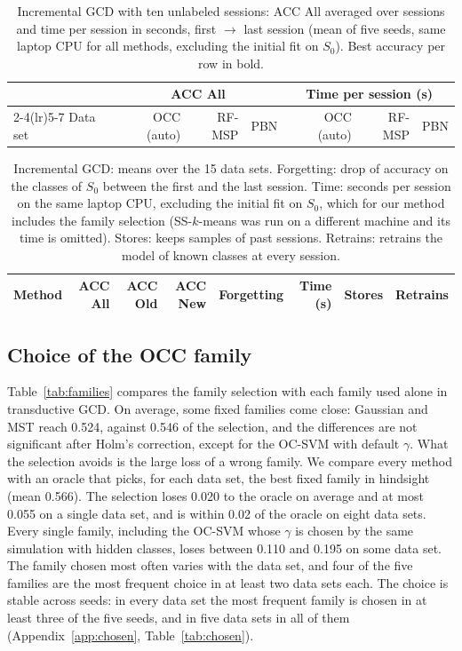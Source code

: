 \documentclass[pdflatex,sn-basic]{sn-jnl}
\begin{document}
\begin{table}[t]
\caption{Incremental GCD with ten unlabeled sessions: ACC All averaged over sessions and time per session in seconds, first $\to$ last session (mean of five seeds, same laptop CPU for all methods, excluding the initial fit on $S_0$). Best accuracy per row in bold.}\label{tab:c4long}
\centering\footnotesize
\begin{tabular}{@{}lrrrrrr@{}}
\toprule
 & \multicolumn{3}{c}{ACC All} & \multicolumn{3}{c}{Time per session (s)} \\
\cmidrule(lr){2-4}\cmidrule(lr){5-7}
Data set & OCC (auto) & RF-MSP & PBN & OCC (auto) & RF-MSP & PBN \\
\midrule

\end{tabular}
\end{table}

\begin{table}[t]
\caption{Incremental GCD: means over the 15 data sets. Forgetting: drop of accuracy on the classes of $S_0$ between the first and the last session. Time: seconds per session on the same laptop CPU, excluding the initial fit on $S_0$, which for our method includes the family selection (SS-$k$-means was run on a different machine and its time is omitted). Stores: keeps samples of past sessions. Retrains: retrains the model of known classes at every session.}\label{tab:c4summary}
\centering\footnotesize
\begin{tabular}{@{}lrrrrrll@{}}
\toprule
Method & ACC All & ACC Old & ACC New & Forgetting & Time (s) & Stores & Retrains \\
\midrule

\end{tabular}
\end{table}

\subsection{Choice of the OCC family}\label{sec:res-selection}

Table~\ref{tab:families} compares the family selection with each family used alone in transductive GCD. On average, some fixed families come close: Gaussian and MST reach 0.524, against 0.546 of the selection, and the differences are not significant after Holm's correction, except for the OC-SVM with default $\gamma$. What the selection avoids is the large loss of a wrong family. We compare every method with an oracle that picks, for each data set, the best fixed family in hindsight (mean 0.566). The selection loses 0.020 to the oracle on average and at most 0.055 on a single data set, and is within 0.02 of the oracle on eight data sets. Every single family, including the OC-SVM whose $\gamma$ is chosen by the same simulation with hidden classes, loses between 0.110 and 0.195 on some data set. The family chosen most often varies with the data set, and four of the five families are the most frequent choice in at least two data sets each. The choice is stable across seeds: in every data set the most frequent family is chosen in at least three of the five seeds, and in five data sets in all of them (Appendix~\ref{app:chosen}, Table~\ref{tab:chosen}).
\end{document}
